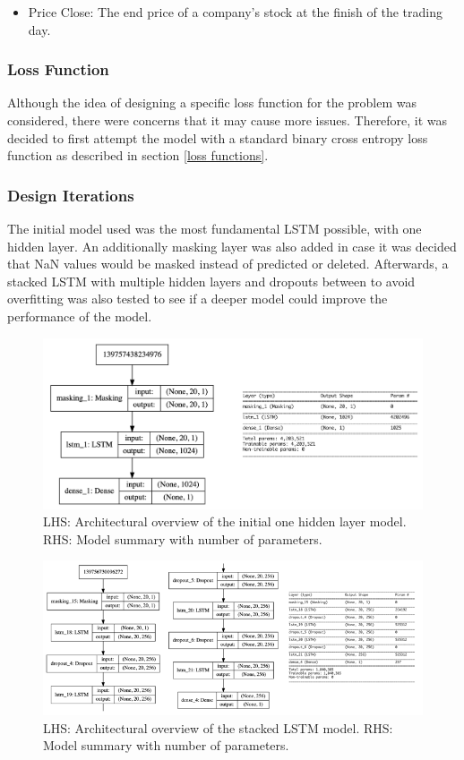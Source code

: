 \documentclass[10pt,onecolumn,letterpaper]{article}
\begin{document}
\begin{itemize}
		\item Price Close: The end price of a company's stock at the finish of the trading day. 
\end{itemize}


\subsubsection{Loss Function}

Although the idea of designing a specific loss function for the problem was considered, there were concerns that it may cause more issues. Therefore, it was decided to first attempt the model with a standard binary cross entropy loss function as described in section \ref{loss functions}.

\subsubsection{Design Iterations} \label{design iterations}

The initial model used was the most fundamental LSTM possible, with one hidden layer. An additionally masking layer was also added in case it was decided that NaN values would be masked instead of predicted or deleted. Afterwards, a stacked LSTM with multiple hidden layers and dropouts between to avoid overfitting was also tested to see if a deeper model could improve the performance of the model. 

\begin{figure}[!hbt!]
\centering
\includegraphics[width=14.5cm]{first_model.png}
\caption{LHS: Architectural overview of the initial one hidden layer model. RHS: Model summary with number of parameters.}
\end{figure}

\begin{figure}[!hbt!]
\centering
\includegraphics[width=14.5cm]{stacked_lstm.png}
\caption{LHS: Architectural overview of the stacked LSTM model. RHS: Model summary with number of parameters.}
\end{figure}
\end{document}

